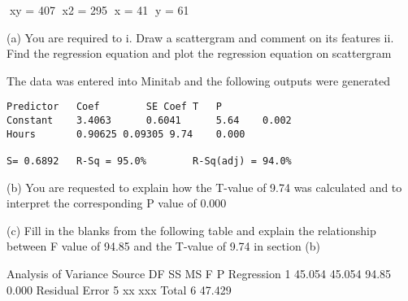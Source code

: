 	xy = 407		x2 = 295		x = 41		y = 61

(a) 	You are required to 
i.	Draw a scattergram and comment on its features
ii.	Find the regression equation and plot the regression equation on scattergram


The data was entered into Minitab and the following outputs were generated

\begin{verbatim}
Predictor	Coef		SE Coef	T	P
Constant	3.4063		0.6041		5.64	0.002
Hours		0.90625	0.09305	9.74	0.000

S= 0.6892	R-Sq = 95.0%		R-Sq(adj) = 94.0%
\end{verbatim}


(b) 	You are requested to explain how the T-value of 9.74 was calculated and to 
interpret the corresponding P value of 0.000


(c)	Fill in the blanks from the following table and explain the relationship between F value of 94.85 and the T-value of 9.74 in section (b)

Analysis of Variance
Source			DF		SS		MS		F		P
Regression		1		45.054		45.054		94.85		0.000
Residual Error		5		xx		xxx		
Total			6		47.429

















